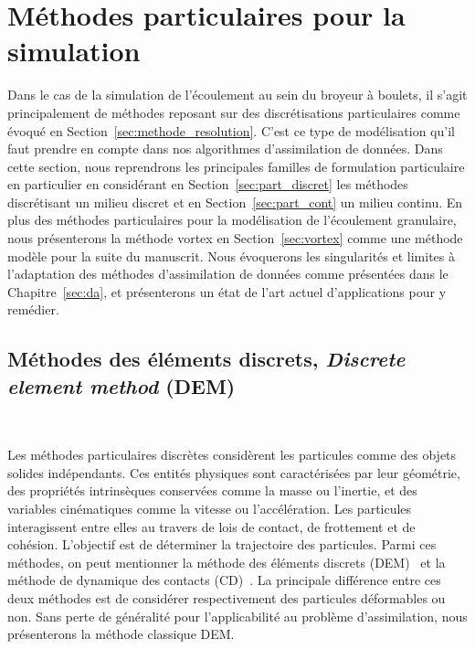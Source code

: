 
\section{Méthodes particulaires pour la simulation}

Dans le cas de la simulation de l'écoulement au sein du broyeur à boulets, il s'agit principalement de méthodes reposant sur des discrétisations particulaires comme évoqué en Section~\ref{sec:methode_resolution}. C'est ce type de modélisation qu'il faut prendre en compte dans nos algorithmes d'assimilation de données. Dans cette section, nous reprendrons les principales familles de formulation particulaire en particulier en considérant en Section~\ref{sec:part_discret} les méthodes discrétisant un milieu discret et en Section~\ref{sec:part_cont} un milieu continu. En plus des méthodes particulaires pour la modélisation de l'écoulement granulaire, nous présenterons la méthode vortex en Section~\ref{sec:vortex} comme une méthode modèle pour la suite du manuscrit. Nous évoquerons les singularités et limites à l'adaptation des méthodes d'assimilation de données comme présentées dans le Chapitre~\ref{sec:da}, et présenterons un état de l'art actuel d'applications pour y remédier.

\subsection{Méthodes des éléments discrets, \textit{Discrete element method} (DEM)}~\label{sec:part_discret}

Les méthodes particulaires discrètes considèrent les particules comme des objets solides indépendants. Ces entités physiques sont caractérisées par leur géométrie, des propriétés intrinsèques conservées comme la masse ou l'inertie, et des variables cinématiques comme la vitesse ou l'accélération. Les particules interagissent entre elles au travers de lois de contact, de frottement et de cohésion. L'objectif est de déterminer la trajectoire des particules. Parmi ces méthodes, on peut mentionner la méthode des éléments discrets (DEM)~\cite{radjai:hal-00691805} et la méthode de dynamique des contacts (CD)~\cite{moreau:hal-01824750}. La principale différence entre ces deux méthodes est de considérer respectivement des particules déformables ou non. Sans perte de généralité pour l'applicabilité au problème d'assimilation, nous présenterons la méthode classique DEM.

